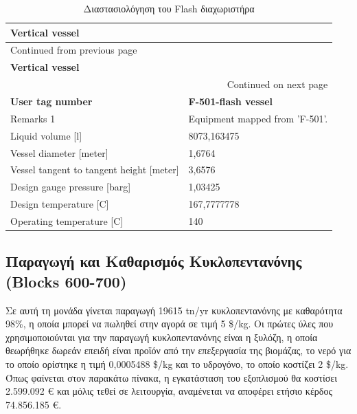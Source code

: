 \documentclass[11pt]{article}
\begin{document}
\begin{longtable}{ll}
\caption{Διαστασιολόγηση του Flash διαχωριστήρα}
\\
\textbf{Vertical vessel} & \\
\hline
\endfirsthead
\multicolumn{2}{l}{Continued from previous page} \\
\hline

\textbf{Vertical vessel} &  \\

\hline
\endhead
\hline\multicolumn{2}{r}{Continued on next page} \\
\endfoot
\endlastfoot
\hline
\textbf{User tag number} & \textbf{F-501-flash vessel}\\
Remarks 1 & Equipment mapped from 'F-501'.\\
Liquid volume [l] & 8073,163475\\
Vessel diameter [meter] & 1,6764\\
Vessel tangent to tangent height [meter] & 3,6576\\
Design gauge pressure [barg] & 1,03425\\
Design temperature [C] & 167,7777778\\
Operating temperature [C] & 140\\
\end{longtable}

\subsection{Παραγωγή και Καθαρισμός Κυκλοπεντανόνης (Blocks 600-700)}
\label{sec:org2a8ddd1}
Σε αυτή τη μονάδα γίνεται παραγωγή 19615 tn/yr κυκλοπεντανόνης με
καθαρότητα 98\%, η οποία μπορεί να πωληθεί στην αγορά σε τιμή 5 \$/kg. Οι
πρώτες ύλες που χρησιμοποιούνται για την παραγωγή κυκλοπεντανόνης είναι
η ξυλόζη, η οποία θεωρήθηκε δωρεάν επειδή είναι προϊόν από την
επεξεργασία της βιομάζας, το νερό για το οποίο ορίστηκε η τιμή 0,0005488
\$/kg και το υδρογόνο, το οποίο κοστίζει 2 \$/kg. Όπως φαίνεται στον παρακάτω πίνακα, η εγκατάσταση του εξοπλισμού θα κοστίσει 2.599.092 € και
μόλις τεθεί σε λειτουργία, αναμένεται να αποφέρει ετήσιο κέρδος
74.856.185 €.
\end{document}
